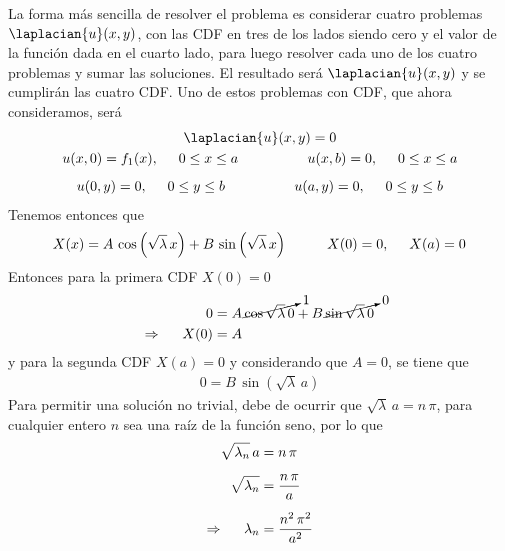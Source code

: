 La forma más sencilla de resolver el problema es considerar cuatro problemas $\laplacian{u}(x, y)$, con las CDF en tres de los lados siendo cero y el valor de la función dada en el cuarto lado, para luego resolver cada uno de los cuatro problemas y sumar las soluciones. El resultado será $\laplacian{u}(x, y)$ y se cumplirán las cuatro CDF. Uno de estos problemas con CDF, que ahora consideramos, será
\begin{align*}
\begin{gathered}
\laplacian{u}(x, y) = 0 \\
u(x, 0) = f_{1} (x), \hspace{0.5cm} 0 \leq x \leq a \hspace{1.75cm} u(x, b) = 0, \hspace{0.5cm} 0 \leq x \leq a \\[0.5em]
u(0, y) = 0, \hspace{0.5cm} 0 \leq y \leq b \hspace{1.75cm} u(a, y) = 0, \hspace{0.5cm} 0 \leq y \leq b
\end{gathered}
\end{align*}
Tenemos entonces que
\begin{align*}
X(x) = A \, \cos \left( \sqrt{\lambda} \, x \right) + B \, \sin \left( \sqrt{\lambda} \, x \right) \hspace{1cm} X(0) = 0, \hspace{0.5cm} X(a) = 0
\end{align*}
Entonces para la primera CDF $X(0) = 0$
\begin{align*}
0 &= A \, \cancelto{1}{\cos \sqrt{\lambda} \, 0} + B \, \cancelto{0}{\sin \sqrt{\lambda} \, 0} \\
\Rightarrow \hspace{0.5cm} X(0) &= A
\end{align*}
y para la segunda CDF $X(a) = 0$ y considerando que $A = 0$, se tiene que
\begin{align*}
0 =  B \, \sin \left( \sqrt{\lambda} \, a \right)
\end{align*}
Para permitir una solución no trivial, debe de ocurrir que $\sqrt{\lambda} \, a = n \, \pi$, para cualquier entero $n$ sea una raíz de la función seno, por lo que
\begin{align*}
\sqrt{\lambda_{n}} \, a &=  n \, \pi \\[0.5em]
\sqrt{\lambda_{n}} &= \dfrac{n \, \pi}{a} \\[0.5em]
\Rightarrow \hspace{0.5cm} \lambda_{n} &= \dfrac{n^{2} \, \pi^{2}}{a^{2}}
\end{align*}
